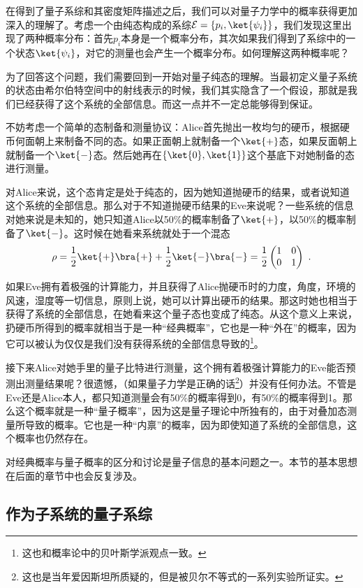 在得到了量子系综和其密度矩阵描述之后，我们可以对量子力学中的概率获得更加深入的理解了。考虑一个由纯态构成的系综$\mathcal{E}=\{p_i,\ket{\psi_i}\}$，我们发现这里出现了两种概率分布：首先$p_i$本身是一个概率分布，其次如果我们得到了系综中的一个状态$\ket{\psi_i}$，对它的测量也会产生一个概率分布。如何理解这两种概率呢？

为了回答这个问题，我们需要回到一开始对量子纯态的理解。当最初定义量子系统的状态由希尔伯特空间中的射线表示的时候，我们其实隐含了一个假设，那就是我们已经获得了这个系统的全部信息。而这一点并不一定总能够得到保证。

不妨考虑一个简单的态制备和测量协议：Alice首先抛出一枚均匀的硬币，根据硬币何面朝上来制备不同的态。如果正面朝上就制备一个$\ket{+}$态，如果反面朝上就制备一个$\ket{-}$态。然后她再在$\{\ket{0},\ket{1}\}$这个基底下对她制备的态进行测量。

对Alice来说，这个态肯定是处于纯态的，因为她知道抛硬币的结果，或者说知道这个系统的全部信息。那么对于不知道抛硬币结果的Eve来说呢？一些系统的信息对她来说是未知的，她只知道Alice以50\%的概率制备了$\ket{+}$，以50\%的概率制备了$\ket{-}$。这时候在她看来系统就处于一个混态
\begin{equation}
\rho=\frac{1}{2}\ket{+}\bra{+}+\frac{1}{2}\ket{-}\bra{-}=\frac{1}{2}\begin{pmatrix}
1 & 0\\
0 & 1
\end{pmatrix}~.
\end{equation}

如果Eve拥有着极强的计算能力，并且获得了Alice抛硬币时的力度，角度，环境的风速，湿度等一切信息，原则上说，她可以计算出硬币的结果。那这时她也相当于获得了系统的全部信息，在她看来这个量子态也变成了纯态。从这个意义上来说，扔硬币所得到的概率就相当于是一种“经典概率”，它也是一种“外在”的概率，因为它可以被认为仅仅是我们没有获得系统的全部信息导致的\footnote{这也和概率论中的贝叶斯学派观点一致。}。

接下来Alice对她手里的量子比特进行测量，这个拥有着极强计算能力的Eve能否预测出测量结果呢？很遗憾，（如果量子力学是正确的话\footnote{这也是当年爱因斯坦所质疑的，但是被贝尔不等式的一系列实验所证实。}）并没有任何办法。不管是Eve还是Alice本人，都只知道测量会有50\%的概率得到0，有50\%的概率得到1。那么这个概率就是一种“量子概率”，因为这是量子理论中所独有的，由于对叠加态测量所导致的概率。它也是一种“内禀”的概率，因为即使知道了系统的全部信息，这个概率也仍然存在。

对经典概率与量子概率的区分和讨论是量子信息的基本问题之一。本节的基本思想在后面的章节中也会反复涉及。

\subsection{作为子系统的量子系综}

